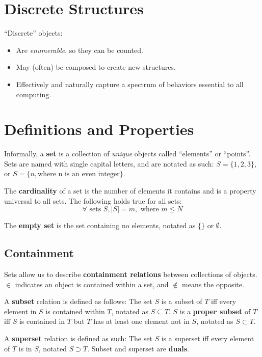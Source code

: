 \documentclass[11pt]{article}
\begin{document}
\section{Discrete Structures}
	``Discrete'' objects:
	\begin{itemize}
		\item Are \textit{enumerable}, so they can be counted.
		\item May (often) be composed to create new structures.
		\item Effectively and naturally capture a spectrum of behaviors essential to all computing.
	\end{itemize}
	
\section{Definitions and Properties}
	Informally, a \textbf{set} is a collection of \textit{unique} objects called ``elements'' or ``points''. Sets are named with single capital letters, and are notated as such: $S=\{1,2,3\}$, or $S = \{n, \text{where n is an even integer}\}$.
	
	The \textbf{cardinality} of a set is the number of elements it contains and is a property universal to all sets. The following holds true for all sets:
	\begin{equation}
		\forall \text{ sets } S, |S|=m, \text{ where } m\leq N
	\end{equation}
	
	The \textbf{empty set} is the set containing no elements, notated as $\{\}$ or $\emptyset$.
	
	\subsection{Containment}
		Sets allow us to describe \textbf{containment relations} between collections of objects. $\in$ indicates an object is contained within a set, and $\notin$ means the opposite.
		
		A \textbf{subset} relation is defined as follows: The set $S$ is a subset of $T$ iff every element in $S$ is contained within $T$, notated as $S\subseteq T$. $S$ is a \textbf{proper subset} of $T$ iff $S$ is contained in $T$ but $T$ has at least one element not in $S$, notated as $S\subset T$.
		
		A \textbf{superset} relation is defined as such: The set $S$ is a superset iff every element of $T$ is in $S$, notated $S\supset T$. Subset and superset are \textbf{duals}.
		
\end{document}

